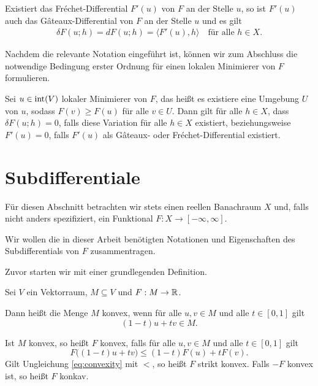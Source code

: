 \begin{remark}
  Existiert das Fr\'echet-Differential $F'(u)$ von $F$ an der Stelle
    $u$, so ist $F'(u)$ auch das G\^ateaux-Differential von $F$ an der Stelle
    $u$ und es gilt 
    \begin{align*}
      \delta F(u;h)=dF(u;h)=\langle F'(u),h\rangle\quad\text{für alle } h\in X.
    \end{align*}
\end{remark}

Nachdem die relevante Notation eingeführt ist, können wir zum Abschluss
die notwendige Bedingung erster Ordnung für einen lokalen Minimierer von $F$
formulieren.

\begin{theorem}
  \label{thm:necessaryConditionFreeLocalExtrema}
  Sei $u\in \operatorname{int}(V)$ lokaler Minimierer von $F$, das heißt
  es existiere eine Umgebung 
  $U$ von $u$, sodass $F(v)\geq F(u)$ für alle $v\in U$. Dann gilt für alle
  $h\in X$, dass $\delta F(u;h) = 0$, falls diese Variation für alle $h\in X$
  existiert, beziehungsweise $F'(u) = 0$, falls $F'(u)$ als 
  G\^ateaux- oder Fr\'echet-Differential existiert.
\end{theorem}

\section{Subdifferentiale}

Für diesen Abschnitt betrachten wir stets einen reellen Banachraum $X$ und,
falls nicht anders spezifiziert, ein Funktional $F:X\to [-\infty,\infty]$.

Wir wollen die in dieser Arbeit benötigten Notationen und
Eigenschaften des Subdifferentials von $F$ zusammentragen.

Zuvor starten wir mit einer grundlegenden Definition.

\begin{definition}
  Sei $V$ ein Vektorraum, $M\subseteq V$ und $F:M\to\mathbb{R}$. 
  
  Dann heißt die Menge $M$ konvex, wenn für alle $u,v\in M$ und alle $t\in
  [0,1]$ gilt $$(1-t)u+tv\in M.$$

  Ist $M$ konvex, so heißt $F$ konvex, falls für alle $u,v\in M$ und alle
  $t\in[0,1]$ gilt 
  \begin{equation}
    \label{eq:convexity}
    F\big( (1-t)u+tv\big)\leq (1-t)F(u)+t F(v).
  \end{equation}
  Gilt Ungleichung \eqref{eq:convexity} mit \glqq$<$\grqq, so heißt
  $F$ strikt konvex. Falls $-F$ konvex ist, so heißt $F$ konkav.
\end{definition}

